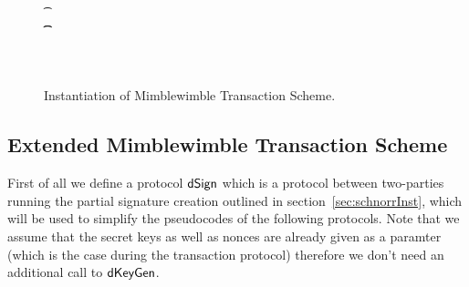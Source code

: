 \begin{figure}
\begin{center}
{\begin{varwidth}{\textwidth}
{            \t \pcif \procVerfProof{\varProofs[\varIterator]}{\varCoinOut[\varIterator]}  \\
            \t \t {} \\
            \varPubKey \opAssign \sum \varOutputs \opSub \sum \varInputs \\
            \pcreturn \procVerf{\varSignature}{\varMsg}{\varPubKey}\\
            }
        \end{varwidth}
        }
    \end{center}
    \caption{Instantiation of Mimblewimble Transaction Scheme. \label{fig:inst-mw-tx}}
\end{figure}

\subsection{Extended Mimblewimble Transaction Scheme}

First of all we define a protocol $\mathsf{dSign}$ which is a protocol between two-parties running the partial signature creation outlined in section~\ref{sec:schnorrInst}, which will be used to simplify the pseudocodes of the
following protocols. Note that we assume that the secret keys as well as nonces are already given as a paramter (which is the case during the transaction protocol) therefore we don't need an additional call to $\mathsf{dKeyGen}$.

